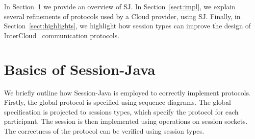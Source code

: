 \documentclass[10pt]{llncs}
\begin{document}


In Section~\ref{sect:basics} we provide an overview of SJ.
In Section~\ref{sect:impl}, we explain several refinements of protocols used by a Cloud provider, using SJ. %
Finally, in Section~\ref{sect:highlights}, we highlight how session types can improve the design of InterCloud~\cite{intercloud} communication protocols.


\section{Basics of Session-Java}
\label{sect:basics}

We briefly outline how Session-Java is employed to correctly implement protocols.
Firstly, the global protocol is specified using sequence diagrams. The global specification is projected to sessions types, which specify the protocol for each participant.
The session is then implemented using operations on session sockets. The correctness of the protocol can be verified using session types.

\end{document}
